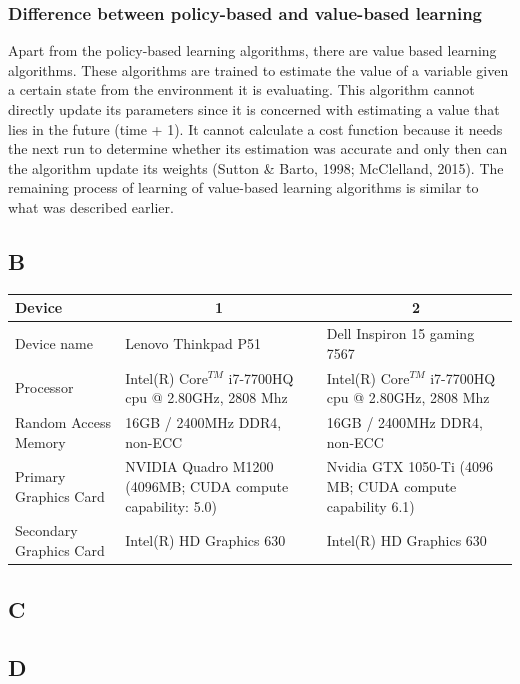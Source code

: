 \subsubsection*{Difference between policy-based and value-based learning}
Apart from the policy-based learning algorithms, there are value based learning algorithms. These algorithms are trained to estimate the value of a variable given a certain state from the environment it is evaluating. This algorithm cannot directly update its parameters since it is concerned with estimating a value that lies in the future (time + 1). It cannot calculate a cost function because it needs the next run to determine whether its estimation was accurate and only then can the algorithm update its weights (Sutton \& Barto, 1998; McClelland, 2015). The remaining process of learning of value-based learning algorithms is similar to what was described earlier.

\subsection*{B}
\begin{table}[]
	\begin{tabular}{ |l|p{5cm}p{5cm}  }
		\hline
		Device                  & \multicolumn{1}{c}{1}                                      & \multicolumn{1}{c}{2}                                     \\ \hline
		Device name             & Lenovo Thinkpad P51                                        & Dell Inspiron 15 gaming 7567                              \\
		Processor               & Intel(R) Core$^{TM}$ i7-7700HQ cpu @ 2.80GHz, 2808 Mhz         & Intel(R) Core$^{TM}$ i7-7700HQ cpu @ 2.80GHz, 2808 Mhz        \\
		Random Access Memory    & 16GB / 2400MHz DDR4, non-ECC                               & 16GB / 2400MHz DDR4, non-ECC                              \\
		Primary Graphics Card   & NVIDIA Quadro M1200 (4096MB; CUDA compute capability: 5.0) & Nvidia GTX 1050-Ti (4096 MB; CUDA compute capability 6.1) \\
		Secondary Graphics Card & Intel(R) HD Graphics 630                                   & Intel(R) HD Graphics 630                                  \\ \hline
	\end{tabular}
\end{table}

\subsection*{C}
\subsection*{D}

